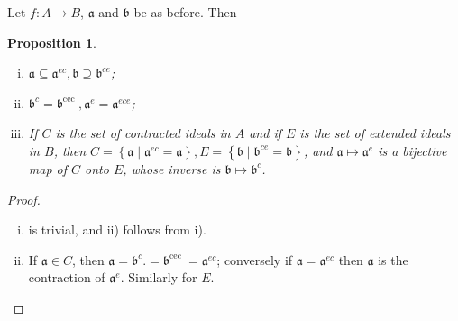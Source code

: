 \documentclass[class=book, crop=false]{standalone}
\newtheorem{proposition}[theorem]{Proposition}
\theoremstyle{definition}
\theoremstyle{remark}
\begin{document}
Let $f: A \to B$, $\mathfrak{a}$ and $\mathfrak{b}$ be as before. Then
\begin{proposition}\label{prop:1.17}
  \begin{enumerate}[i)]
    \item
          $\mathfrak{a} \subseteq \mathfrak{a}^{e c}, \mathfrak{b} \supseteq \mathfrak{b}^{c e}$;
    \item
          $\mathfrak{b}^{c}=\mathfrak{b}^{\text {cec }}, \mathfrak{a}^{e}=\mathfrak{a}^{e c e}$;
    \item If $C$ is the set of contracted ideals in $A$ and if $E$ is the set of
          extended ideals in $B$, then
          $C=\left\{\mathfrak{a} \mid \mathfrak{a}^{e c}=\mathfrak{a}\right\}, E=\left\{\mathfrak{b} \mid \mathfrak{b}^{c e}=\mathfrak{b}\right\}$,
          and $\mathfrak{a} \mapsto \mathfrak{a}^{e}$ is a bijective map of $C$
          onto $E$, whose inverse is $\mathfrak{b} \mapsto \mathfrak{b}^{c}$.
  \end{enumerate}
\end{proposition}
\begin{proof}
  \begin{enumerate}[i)]
    \item is trivial, and ii) follows from i).
    \item If $\mathfrak{a} \in C$, then
          $\mathfrak{a}=\mathfrak{b}^{c} .=\mathfrak{b}^{\text {cec }}=\mathfrak{a}^{e c}$;
          conversely if $\mathfrak{a}=\mathfrak{a}^{e c}$ then $\mathfrak{a}$ is
          the contraction of $\mathfrak{a}^{e}$. Similarly for $E$.
  \end{enumerate}
\end{proof}
\end{document}
